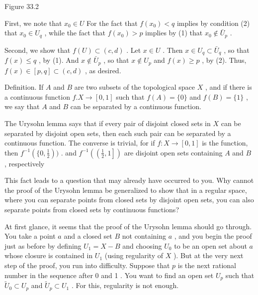 Figure 33.2

First, we note that \({x}_{0} \in  U\) For the fact that \(f\left( {x}_{0}\right)  < q\) implies by condition (2) that \({x}_{0} \in  {U}_{q}\) , while the fact that \(f\left( {x}_{0}\right)  > p\) implies by (1) that \({x}_{0} \notin  {\bar{U}}_{p}\) .

Second, we show that \(f\left( U\right)  \subset  \left( {c,d}\right)\) . Let \(x \in  U\) . Then \(x \in  {U}_{q} \subset  {\bar{U}}_{q}\) , so that \(f\left( x\right)  \leq  q\) , by (1). And \(x \notin  {\bar{U}}_{p}\) , so that \(x \notin  {U}_{p}\) and \(f\left( x\right)  \geq  p\) , by (2). Thus, \(f\left( x\right)  \in  \left\lbrack  {p,q}\right\rbrack   \subset  \left( {c,d}\right)\) , as desired.

Definition. If \(A\) and \(B\) are two subsets of the topological space \(X\) , and if there is a continuous function \(f.X \rightarrow  \left\lbrack  {0,1}\right\rbrack\) such that \(f\left( A\right)  = \{ 0\}\) and \(f\left( B\right)  = \{ 1\}\) , we say that \(A\) and \(B\) can be separated by a continuous function.

The Urysohn lemma says that if every pair of disjoint closed sets in \(X\) can be separated by disjoint open sets, then each such pair can be separated by a continuous function. The converse is trivial, for if \(f : X \rightarrow  \left\lbrack  {0,1}\right\rbrack\) is the function, then \({f}^{-1}\left( {\{ 0,\frac{1}{2}}\right) )\) . and \({f}^{-1}\left( \left( {\frac{1}{2},1}\right\rbrack  \right)\) are disjoint open sets containing \(A\) and \(B\) , respectively

This fact leads to a question that may already have occurred to you. Why cannot the proof of the Urysohn lemma be generalized to show that in a regular space, where you can separate points from closed sets by disjoint open sets, you can also separate points from closed sets by continuous functions?

At first glance, it seems that the proof of the Urysohn lemma should go through. You take a point \(a\) and a closed set \(B\) not containing \(a\) , and you begin the proof just as before by defining \({U}_{1} = X - B\) and choosing \({U}_{0}\) to be an open set about \(a\) whose closure is contained in \({U}_{1}\) (using regularity of \(X\) ). But at the very next step of the proof, you run into difficulty. Suppose that \(p\) is the next rational number in the sequence after 0 and 1 . You want to find an open set \({U}_{p}\) such that \({\widetilde{U}}_{0} \subset  {U}_{p}\) and \({\widetilde{U}}_{p} \subset  {U}_{1}\) . For this, regularity is not enough.

